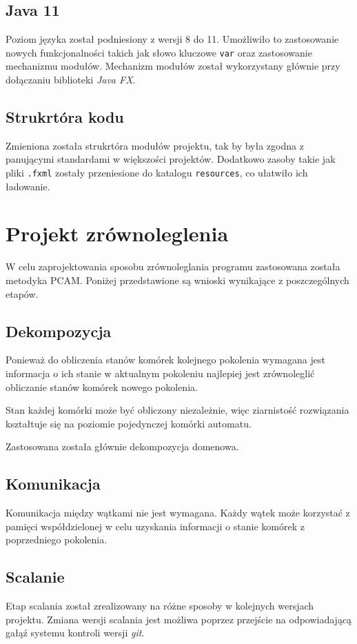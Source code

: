 \documentclass{mwart}
\begin{document}
\subsection*{Java 11}
Poziom języka został podniesiony z wersji 8 do 11. Umożliwiło to zastosowanie nowych funkcjonalności takich jak słowo kluczowe \texttt{var} oraz zastosowanie mechanizmu modułów.
Mechanizm modułów został wykorzystany głównie przy dołączaniu biblioteki \textit{Java FX}.

\subsection*{Strukrtóra kodu}
Zmieniona została strukrtóra modułów projektu, tak by była zgodna z panującymi standardami w większości projektów. Dodatkowo zasoby takie jak pliki \texttt{.fxml} zostały przeniesione do katalogu \texttt{resources}, co ułatwiło ich ładowanie.

\section{Projekt zrównoleglenia}
W celu zaprojektowania sposobu zrównoleglania programu zastosowana została metodyka PCAM. Poniżej przedstawione są wnioski wynikające z poszczególnych etapów.

\subsection{Dekompozycja}
Ponieważ do obliczenia stanów komórek kolejnego pokolenia wymagana jest informacja o ich stanie w aktualnym pokoleniu najlepiej jest zrównoleglić obliczanie stanów komórek nowego pokolenia.

Stan każdej komórki może być obliczony niezależnie, więc ziarnistość rozwiązania kształtuje się na poziomie pojedynczej komórki automatu.

Zastosowana została głównie dekompozycja domenowa.

\subsection{Komunikacja}
Komunikacja między wątkami nie jest wymagana. Każdy wątek może korzystać z pamięci współdzielonej w celu uzyskania informacji o stanie komórek z poprzedniego pokolenia.

\subsection{Scalanie}
Etap scalania został zrealizowany na różne sposoby w kolejnych wersjach projektu. Zmiana wersji scalania jest możliwa poprzez przejście na odpowiadającą gałąź systemu kontroli wersji \textit{git}.
\end{document}
